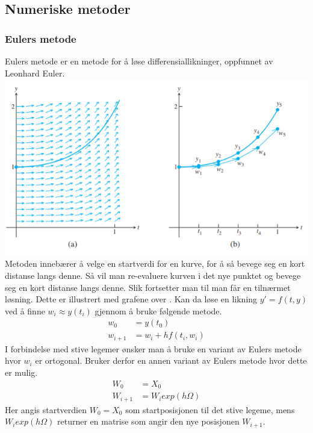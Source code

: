 \graphicspath{ {./bilder/} }
\subsection{Numeriske metoder}
\subsubsection{Eulers metode}
Eulers metode er en metode for å løse differensiallikninger, oppfunnet av Leonhard Euler. \newline
\includegraphics{rapport/teori/bilder/eulers.png}\newline\newline
Metoden innebærer å velge en startverdi for en kurve, for å så bevege seg en kort distanse langs denne. Så vil man re-evaluere kurven i det nye punktet og bevege seg en kort distanse langs denne. Slik fortsetter man til man får en tilnærmet løsning. Dette er illustrert med grafene over \cite{MATEMATIKK:1}.\newline\newline
Kan da løse en likning $y' = f(t, y)$ ved å finne $w_i \approx y(t_i)$ gjennom å bruke følgende metode.
\begin{equation}
\begin{aligned}
    w_0&=y(t_0)\\
    w_{i+1}&=w_i + hf(t_i, w_i)
\end{aligned}
\end{equation}
I forbindelse med stive legemer ønsker man å bruke en variant av Eulers metode hvor $w_i$ er ortogonal. Bruker derfor en annen variant av Eulers metode hvor dette er mulig.
\begin{equation}
\begin{aligned}
    W_0&=X_0\\
    W_{i+1}&=W_iexp(h\Omega)
\end{aligned}
\end{equation}
Her angis startverdien $W_0=X_0$ som startposisjonen til det stive legeme, mens $W_iexp(h\Omega)$ returner en matrise som angir den nye posisjonen $W_{i+1}$.


